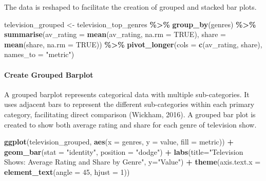 \documentclass[
]{book}
\newenvironment{Shaded}{\begin{snugshade}}{\end{snugshade}}
\newcommand{\AttributeTok}[1]{\textcolor[rgb]{0.13,0.29,0.53}{#1}}
\newcommand{\ConstantTok}[1]{\textcolor[rgb]{0.56,0.35,0.01}{#1}}
\newcommand{\DecValTok}[1]{\textcolor[rgb]{0.00,0.00,0.81}{#1}}
\newcommand{\FunctionTok}[1]{\textcolor[rgb]{0.13,0.29,0.53}{\textbf{#1}}}
\newcommand{\NormalTok}[1]{#1}
\newcommand{\OtherTok}[1]{\textcolor[rgb]{0.56,0.35,0.01}{#1}}
\newcommand{\SpecialCharTok}[1]{\textcolor[rgb]{0.81,0.36,0.00}{\textbf{#1}}}
\newcommand{\StringTok}[1]{\textcolor[rgb]{0.31,0.60,0.02}{#1}}
\begin{document}
The data is reshaped to facilitate the creation of grouped and stacked bar plots.

\begin{Shaded}
\begin{Highlighting}[]
\NormalTok{television\_grouped }\OtherTok{\textless{}{-}}\NormalTok{ television\_top\_genres }\SpecialCharTok{\%\textgreater{}\%}
  \FunctionTok{group\_by}\NormalTok{(genres) }\SpecialCharTok{\%\textgreater{}\%}
  \FunctionTok{summarise}\NormalTok{(}\AttributeTok{av\_rating =} \FunctionTok{mean}\NormalTok{(av\_rating, }\AttributeTok{na.rm =} \ConstantTok{TRUE}\NormalTok{),}
            \AttributeTok{share =} \FunctionTok{mean}\NormalTok{(share, }\AttributeTok{na.rm =} \ConstantTok{TRUE}\NormalTok{)) }\SpecialCharTok{\%\textgreater{}\%}
  \FunctionTok{pivot\_longer}\NormalTok{(}\AttributeTok{cols =} \FunctionTok{c}\NormalTok{(av\_rating, share), }\AttributeTok{names\_to =} \StringTok{"metric"}\NormalTok{)}
\end{Highlighting}
\end{Shaded}

\paragraph*{Create Grouped Barplot}\label{create-grouped-barplot}

A grouped barplot represents categorical data with multiple sub-categories. It uses adjacent bars to represent the different sub-categories within each primary category, facilitating direct comparison (Wickham, 2016). A grouped bar plot is created to show both average rating and share for each genre of television show.

\begin{Shaded}
\begin{Highlighting}[]
\FunctionTok{ggplot}\NormalTok{(television\_grouped, }\FunctionTok{aes}\NormalTok{(}\AttributeTok{x =}\NormalTok{ genres, }\AttributeTok{y =}\NormalTok{ value, }\AttributeTok{fill =}\NormalTok{ metric)) }\SpecialCharTok{+}
  \FunctionTok{geom\_bar}\NormalTok{(}\AttributeTok{stat =} \StringTok{"identity"}\NormalTok{, }\AttributeTok{position =} \StringTok{"dodge"}\NormalTok{) }\SpecialCharTok{+}
  \FunctionTok{labs}\NormalTok{(}\AttributeTok{title=}\StringTok{"Television Shows: Average Rating and Share by Genre"}\NormalTok{, }\AttributeTok{y=}\StringTok{"Value"}\NormalTok{) }\SpecialCharTok{+}
  \FunctionTok{theme}\NormalTok{(}\AttributeTok{axis.text.x =} \FunctionTok{element\_text}\NormalTok{(}\AttributeTok{angle =} \DecValTok{45}\NormalTok{, }\AttributeTok{hjust =} \DecValTok{1}\NormalTok{))}
\end{Highlighting}
\end{Shaded}
\end{document}
